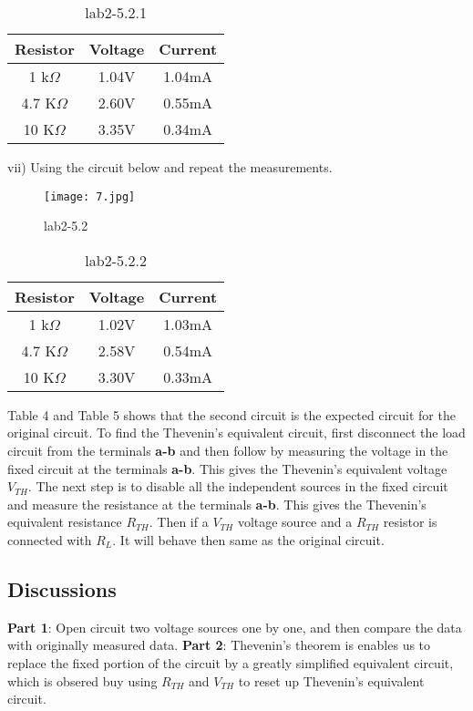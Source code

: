 \documentclass[12pt,fleqn]{article}
\begin{document}
\begin{table}[H]
  \centering
  \begin{tabular}{| c | c | c |}
    \hline
    \textbf{Resistor} & \textbf{Voltage} & \textbf{Current} \\
    \hline
    1 k\ensuremath{\Omega} & 1.04V & 1.04mA \\
    \hline
    4.7 K\ensuremath{\Omega} & 2.60V & 0.55mA \\
    \hline
    10 K\ensuremath{\Omega} & 3.35V & 0.34mA \\
     \hline
  \end{tabular}
  \caption{lab2-5.2.1}
\end{table}

vii) Using the circuit below and repeat the measurements.\\
\begin{figure}[H]
\centering
\texttt{[image: 7.jpg]}
\caption{lab2-5.2}
\end{figure}


\begin{table}[H]
  \centering
  \begin{tabular}{| c | c | c |}
    \hline
    \textbf{Resistor} & \textbf{Voltage} & \textbf{Current} \\
    \hline
    1 k\ensuremath{\Omega} & 1.02V & 1.03mA \\
    \hline
    4.7 K\ensuremath{\Omega} & 2.58V & 0.54mA \\
    \hline
    10 K\ensuremath{\Omega} & 3.30V & 0.33mA \\
    \hline
  \end{tabular}
  \caption{lab2-5.2.2}
\end{table}
Table 4 and Table 5 shows that the second circuit is the expected circuit for the original circuit. To find the Thevenin’s equivalent circuit, first disconnect the load circuit from the terminals \textbf{a-b} and then follow by measuring the voltage in the fixed circuit at the terminals \textbf{a-b}. This gives the Thevenin’s equivalent voltage $V_{TH}$. The next step is to disable all the independent sources in the fixed circuit and measure the resistance at the terminals \textbf{a-b}. This gives the Thevenin’s equivalent resistance $R_{TH}$. Then if a $V_{TH}$ voltage source and a $R_{TH}$ resistor is connected with $R_L$. It will behave then same as the original circuit.
\subsection{Discussions}
\textbf{Part 1}: Open circuit two voltage sources one by one, and then compare the data with originally measured data.
\textbf{Part 2}: Thevenin's theorem is enables us to replace the fixed portion of the circuit by a greatly simplified equivalent circuit, which is obsered buy using $R_{TH}$ and $V_{TH}$ to reset up Thevenin's equivalent circuit.
\end{document}
